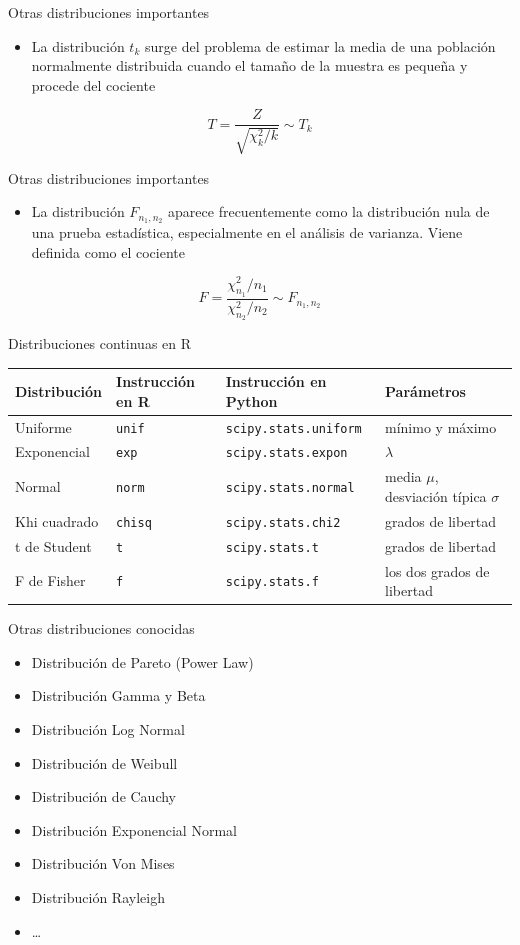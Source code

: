 \documentclass[
  ignorenonframetext,
]{beamer}
\providecommand{\tightlist}{%
  \setlength{\itemsep}{0pt}\setlength{\parskip}{0pt}}
\begin{document}
\begin{frame}{Otras distribuciones importantes}
\protect\hypertarget{otras-distribuciones-importantes-1}{}
\begin{itemize}
\tightlist
\item
  La distribución \(t_k\) surge del problema de estimar la media de una
  población normalmente distribuida cuando el tamaño de la muestra es
  pequeña y procede del cociente
\end{itemize}

\[T = \frac{Z}{\sqrt{\chi^2_k/k}}\sim T_k\]
\end{frame}

\begin{frame}{Otras distribuciones importantes}
\protect\hypertarget{otras-distribuciones-importantes-2}{}
\begin{itemize}
\tightlist
\item
  La distribución \(F_{n_1,n_2}\) aparece frecuentemente como la
  distribución nula de una prueba estadística, especialmente en el
  análisis de varianza. Viene definida como el cociente
\end{itemize}

\[F = \frac{\chi^2_{n_1}/n_1}{\chi^2_{n_2}/n_2}\sim F_{n_1,n_2}\]
\end{frame}

\begin{frame}[fragile]{Distribuciones continuas en R}
\protect\hypertarget{distribuciones-continuas-en-r}{}
\begin{longtable}[]{@{}llll@{}}
\toprule
Distribución & Instrucción en R & Instrucción en Python &
Parámetros\tabularnewline
\midrule
\endhead
Uniforme & \texttt{unif} & \texttt{scipy.stats.uniform} & mínimo y
máximo\tabularnewline
Exponencial & \texttt{exp} & \texttt{scipy.stats.expon} &
\(\lambda\)\tabularnewline
Normal & \texttt{norm} & \texttt{scipy.stats.normal} & media \(\mu\),
desviación típica \(\sigma\)\tabularnewline
Khi cuadrado & \texttt{chisq} & \texttt{scipy.stats.chi2} & grados de
libertad\tabularnewline
t de Student & \texttt{t} & \texttt{scipy.stats.t} & grados de
libertad\tabularnewline
F de Fisher & \texttt{f} & \texttt{scipy.stats.f} & los dos grados de
libertad\tabularnewline
\bottomrule
\end{longtable}
\end{frame}

\begin{frame}{Otras distribuciones conocidas}
\protect\hypertarget{otras-distribuciones-conocidas}{}
\begin{itemize}
\tightlist
\item
  Distribución de Pareto (Power Law)
\item
  Distribución Gamma y Beta
\item
  Distribución Log Normal
\item
  Distribución de Weibull
\item
  Distribución de Cauchy
\item
  Distribución Exponencial Normal
\item
  Distribución Von Mises
\item
  Distribución Rayleigh
\item
  \ldots{}
\end{itemize}
\end{frame}
\end{document}

